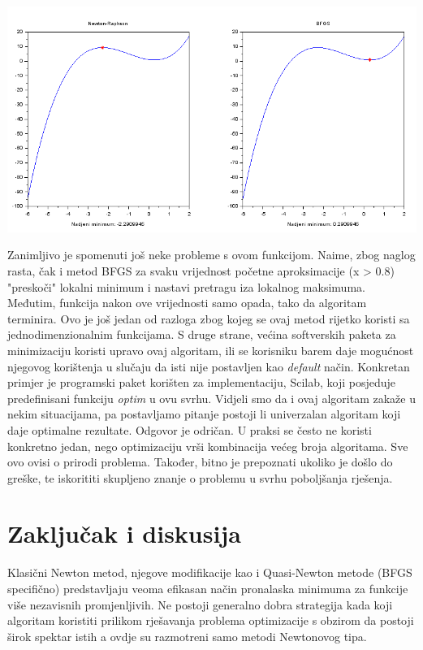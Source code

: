 \documentclass[bosnian,12pt,a4paper]{report}
\begin{document}
\begin{center}
   \includegraphics[scale=0.7]{nrvsbfgs.png}
\end{center}


Zanimljivo je spomenuti još neke probleme s ovom funkcijom. Naime, zbog naglog rasta, čak i metod BFGS za svaku vrijednost početne aproksimacije (x > 0.8) "preskoči" lokalni minimum i nastavi pretragu iza lokalnog maksimuma. Međutim, funkcija nakon ove vrijednosti samo opada, tako da algoritam terminira. Ovo je još jedan od razloga zbog kojeg se ovaj metod rijetko koristi sa jednodimenzionalnim funkcijama.
\justify
S druge strane, većina softverskih paketa za minimizaciju koristi upravo ovaj algoritam, ili se korisniku barem daje mogućnost njegovog  korištenja u slučaju da isti nije postavljen kao \textit{default} način. Konkretan primjer je programski paket korišten za implementaciju, Scilab, koji posjeduje predefinisani funkciju \textit{optim} u ovu svrhu. 
\justify
Vidjeli smo da i ovaj algoritam zakaže u nekim situacijama, pa postavljamo pitanje postoji li univerzalan algoritam koji daje optimalne rezultate. Odgovor je odričan. U praksi se često ne koristi konkretno jedan, nego optimizaciju vrši kombinacija većeg broja algoritama. Sve ovo ovisi o prirodi problema. Također, bitno je prepoznati ukoliko je došlo do greške, te iskorititi skupljeno znanje o problemu u svrhu poboljšanja rješenja. 


	\chapter{Zaključak i diskusija}
	Klasični Newton metod, njegove modifikacije kao i Quasi-Newton metode (BFGS specifično) predstavljaju veoma efikasan način pronalaska minimuma za funkcije više nezavisnih promjenljivih. Ne postoji generalno dobra strategija kada koji algoritam koristiti prilikom rješavanja problema optimizacije s obzirom da postoji širok spektar istih a ovdje su razmotreni samo metodi Newtonovog tipa. 
	
\end{document}
